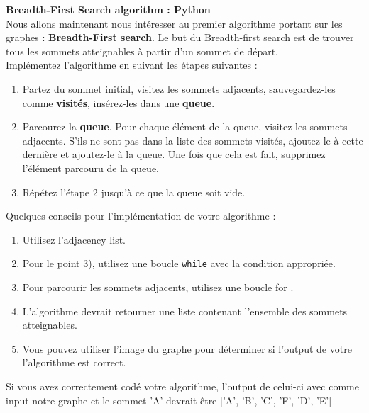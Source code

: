\begin{Exercice}[15 minutes]  \textbf{Breadth-First Search algorithm : Python}\\
    Nous allons maintenant nous intéresser au premier algorithme portant sur les graphes : \textbf{Breadth-First search}. Le but du Breadth-first search est de trouver tous les sommets atteignables à partir d'un sommet de départ.\\
    Implémentez l'algorithme en suivant les étapes suivantes :\\
    \begin{enumerate}
    
    \item Partez du sommet initial, visitez les sommets adjacents, sauvegardez-les comme \textbf{visités}, insérez-les dans une \textbf{queue}.
    
    \item Parcourez la \textbf{queue}. Pour chaque élément de la queue, visitez les sommets adjacents. S'ils ne sont pas dans la liste des sommets visités, ajoutez-le à cette dernière et ajoutez-le à la queue. Une fois que cela est fait, supprimez l'élément parcouru de la queue.
    
    \item Répétez l'étape 2 jusqu'à ce que la queue soit vide.\\

    \end{enumerate}

    \begin{conseil}
        Quelques conseils pour l'implémentation de votre algorithme :
        \begin{enumerate}
            \item Utilisez l'adjacency list.
            \item Pour le point 3), utilisez une boucle \lstinline{while} avec la condition appropriée.
            \item Pour parcourir les sommets adjacents, utilisez une boucle for .
            \item L'algorithme devrait retourner une liste contenant l'ensemble des sommets atteignables.
            \item Vous pouvez utiliser l'image du graphe pour déterminer si l'output de votre l'algorithme est correct.
        \end{enumerate}
    \end{conseil}
    \begin{solution}
        
        Si vous avez correctement codé votre algorithme, l'output de celui-ci avec comme input notre graphe et le sommet 'A' devrait être ['A', 'B', 'C', 'F', 'D', 'E']
    \end{solution}
\end{Exercice}

